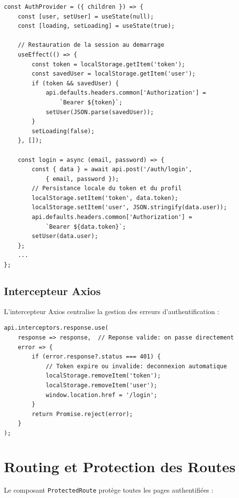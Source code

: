 \documentclass[12pt,a4paper]{report}
\begin{document}
\begin{lstlisting}[style=js, caption={AuthContext.js — Gestion de l'état d'authentification}]
const AuthProvider = ({ children }) => {
    const [user, setUser] = useState(null);
    const [loading, setLoading] = useState(true);

    // Restauration de la session au demarrage
    useEffect(() => {
        const token = localStorage.getItem('token');
        const savedUser = localStorage.getItem('user');
        if (token && savedUser) {
            api.defaults.headers.common['Authorization'] =
                `Bearer ${token}`;
            setUser(JSON.parse(savedUser));
        }
        setLoading(false);
    }, []);

    const login = async (email, password) => {
        const { data } = await api.post('/auth/login',
            { email, password });
        // Persistance locale du token et du profil
        localStorage.setItem('token', data.token);
        localStorage.setItem('user', JSON.stringify(data.user));
        api.defaults.headers.common['Authorization'] =
            `Bearer ${data.token}`;
        setUser(data.user);
    };
    ...
};
\end{lstlisting}

\subsection{Intercepteur Axios}

L'intercepteur Axios centralise la gestion des erreurs d'authentification :

\begin{lstlisting}[style=js, caption={api.js — Intercepteur Axios}]
api.interceptors.response.use(
    response => response,  // Reponse valide: on passe directement
    error => {
        if (error.response?.status === 401) {
            // Token expire ou invalide: deconnexion automatique
            localStorage.removeItem('token');
            localStorage.removeItem('user');
            window.location.href = '/login';
        }
        return Promise.reject(error);
    }
);
\end{lstlisting}

\section{Routing et Protection des Routes}

Le composant \texttt{ProtectedRoute} protège toutes les pages authentifiées :
\end{document}
